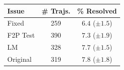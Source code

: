     \centering
    \begin{tabular}{l|cc}
\toprule
Issue & \# Trajs. & \% Resolved \\
\midrule
Fixed     & 259 & $6.4$ ($\pm 1.5$) \\
F2P Test  & 390 & $7.3$ ($\pm 1.9$) \\
LM        & 328 & $7.7$ ($\pm 1.5$) \\
Original  & 319 & $7.8$ ($\pm 1.8$) \\
\bottomrule
\end{tabular}
\caption{
Comparing training on $600$ PR Mirror instances with varied issue text.
}
    \label{tab:ablation_issue}
